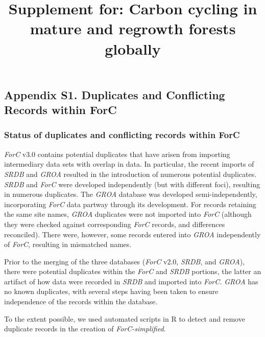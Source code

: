 \documentclass[
]{article}
\title{Supplement for: Carbon cycling in mature and regrowth forests
globally}
\author{}
\date{\vspace{-2.5em}}
\begin{document}
\maketitle

{
\setcounter{tocdepth}{2}
\tableofcontents
}
\raggedright

\newpage

\hypertarget{appendix-s1.-duplicates-and-conflicting-records-within-forc}{%
\subsection{Appendix S1. Duplicates and Conflicting Records within
ForC}\label{appendix-s1.-duplicates-and-conflicting-records-within-forc}}

\hypertarget{status-of-duplicates-and-conflicting-records-within-forc}{%
\subsubsection{Status of duplicates and conflicting records within
ForC}\label{status-of-duplicates-and-conflicting-records-within-forc}}

\emph{ForC} v3.0 contains potential duplicates that have arisen from
importing intermediary data sets with overlap in data. In particular,
the recent imports of \emph{SRDB} and \emph{GROA} resulted in the
introduction of numerous potential duplicates. \emph{SRDB} and
\emph{ForC} were developed independently (but with different foci),
resulting in numerous duplicates. The \emph{GROA} database was developed
semi-independently, incorporating \emph{ForC} data partway through its
development. For records retaining the same site names, \emph{GROA}
duplicates were not imported into \emph{ForC} (although they were
checked against corresponding \emph{ForC} records, and differences
reconciled). There were, however, some records entered into \emph{GROA}
independently of \emph{ForC}, resulting in mismatched names.

Prior to the merging of the three databases (\emph{ForC} v2.0,
\emph{SRDB}, and \emph{GROA}), there were potential duplicates within
the \emph{ForC} and \emph{SRDB} portions, the latter an artifact of how
data were recorded in \emph{SRDB} and imported into \emph{ForC.}
\emph{GROA} has no known duplicates, with several steps having been
taken to ensure independence of the records within the database.

To the extent possible, we used automated scripts in R to detect and
remove duplicate records in the creation of \emph{ForC-simplified}.
\end{document}
